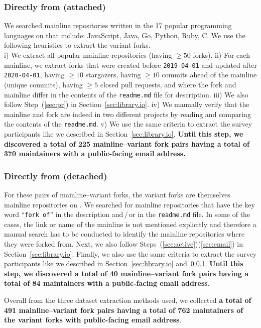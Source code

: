 \subsubsection{Directly from \gh (attached)}
\label{sec:github-attached}
We searched mainline repositories written in the 17 popular programming languages on \gh that include: JavaScript, Java, Go, Python, Ruby, C. We use the following heuristics to extract the variant forks.\\i) We extract all popular mainline repositories (having $\geq 50$ forks). ii) For each mainline, we extract forks that were created before \texttt{2019-04-01} and updated after \texttt{2020-04-01}, having $\geq 10$ stargazers, having $\geq 10$ commits ahead of the mainline (unique commits), having $\geq 5$ closed pull requests, and where the fork and mainline differ in the contents of the \texttt{readme.md} file for description. iii) We also follow Step~(\ref{sec:pr}) in Section~\ref{sec:library.io}.
iv) We manually verify that the mainline and fork are indeed in two different projects by reading and comparing the contents of the \texttt{readme.md}. v) We use the same criteria to extract the survey participants like we described in Section~\ref{sec:library.io}. \textbf{Until this step, we discovered a total of 225 mainline--variant fork pairs having a total of 370 maintainers with a public-facing email address.}

\subsubsection{Directly from \gh (detached)}
\label{sec:github-detached}
For these pairs of mainline--variant forks, the variant forks are themselves mainline repositories on \gh. 
We searched for mainline repositories that have the key word ``\texttt{fork of}'' in the description and\,/\,or in the \texttt{readme.md} file. In some of the cases, the link or name of the mainline is not mentioned explicitly and therefore a manual search has to be conducted to identify the mainline repositories where they were forked from. Next, we also follow Steps~(\ref{sec:active})\ra (\ref{sec:email}) in Section~\ref{sec:library.io}.
Finally, we also use the same criteria to extract the survey participants like we described in Section~\ref{sec:library.io} and~\ref{sec:github-attached}. \textbf{Until this step, we discovered a total of 40 mainline--variant fork pairs having a total of 84 maintainers with a public-facing email address.}

\nd Overall from the three dataset extraction methods used, we collected \textbf{a total of 491 mainline--variant fork pairs having a total of 762 maintainers of the variant forks with public-facing email address}. 

